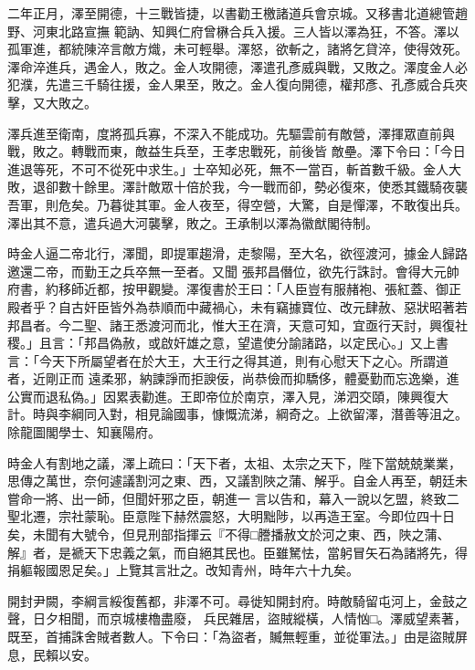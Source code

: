 \begin{pinyinscope}
 二年正月，澤至開德，十三戰皆捷，以書勸王檄諸道兵會京城。又移書北道總管趙野、河東北路宣撫
 範訥、知興仁府曾楙合兵入援。三人皆以澤為狂，不答。澤以孤軍進，都統陳淬言敵方熾，未可輕舉。澤怒，欲斬之，諸將乞貸淬，使得效死。澤命淬進兵，遇金人，敗之。金人攻開德，澤遣孔彥威與戰，又敗之。澤度金人必犯濮，先遣三千騎往援，金人果至，敗之。金人復向開德，權邦彥、孔彥威合兵夾擊，又大敗之。



 澤兵進至衛南，度將孤兵寡，不深入不能成功。先驅雲前有敵營，澤揮眾直前與戰，敗之。轉戰而東，敵益生兵至，王孝忠戰死，前後皆
 敵壘。澤下令曰：「今日進退等死，不可不從死中求生。」士卒知必死，無不一當百，斬首數千級。金人大敗，退卻數十餘里。澤計敵眾十倍於我，今一戰而卻，勢必復來，使悉其鐵騎夜襲吾軍，則危矣。乃暮徙其軍。金人夜至，得空營，大驚，自是憚澤，不敢復出兵。澤出其不意，遣兵過大河襲擊，敗之。王承制以澤為徽猷閣待制。



 時金人逼二帝北行，澤聞，即提軍趨滑，走黎陽，至大名，欲徑渡河，據金人歸路邀還二帝，而勤王之兵卒無一至者。又聞
 張邦昌僭位，欲先行誅討。會得大元帥府書，約移師近都，按甲觀變。澤復書於王曰：「人臣豈有服赭袍、張紅蓋、御正殿者乎？自古奸臣皆外為恭順而中藏禍心，未有竊據寶位、改元肆赦、惡狀昭著若邦昌者。今二聖、諸王悉渡河而北，惟大王在濟，天意可知，宜亟行天討，興復社稷。」且言：「邦昌偽赦，或啟奸雄之意，望遣使分諭諸路，以定民心。」又上書言：「今天下所屬望者在於大王，大王行之得其道，則有心慰天下之心。所謂道者，近剛正而
 遠柔邪，納諫諍而拒諛佞，尚恭儉而抑驕侈，體憂勤而忘逸樂，進公實而退私偽。」因累表勸進。王即帝位於南京，澤入見，涕泗交頤，陳興復大計。時與李綱同入對，相見論國事，慷慨流涕，綱奇之。上欲留澤，潛善等沮之。除龍圖閣學士、知襄陽府。



 時金人有割地之議，澤上疏曰：「天下者，太祖、太宗之天下，陛下當兢兢業業，思傳之萬世，奈何遽議割河之東、西，又議割陜之蒲、解乎。自金人再至，朝廷未嘗命一將、出一師，但聞奸邪之臣，朝進一
 言以告和，幕入一說以乞盟，終致二聖北遷，宗社蒙恥。臣意陛下赫然震怒，大明黜陟，以再造王室。今即位四十日矣，未聞有大號令，但見刑部指揮云『不得□謄播赦文於河之東、西，陜之蒲、解』者，是褫天下忠義之氣，而自絕其民也。臣雖駑怯，當躬冒矢石為諸將先，得捐軀報國恩足矣。」上覽其言壯之。改知青州，時年六十九矣。



 開封尹闕，李綱言綏復舊都，非澤不可。尋徙知開封府。時敵騎留屯河上，金鼓之聲，日夕相聞，而京城樓櫓盡廢，
 兵民雜居，盜賊縱橫，人情忷□。澤威望素著，既至，首捕誅舍賊者數人。下令曰：「為盜者，贓無輕重，並從軍法。」由是盜賊屏息，民賴以安。




\end{pinyinscope}

